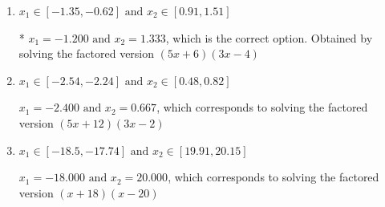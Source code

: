 \documentclass{extbook}[14pt]
\begin{document}
\begin{enumerate}
{\begin{enumerate}[label=\Alph*.]
$x_1 = -0.600 \text{ and } x_2 = 2.667$, which corresponds to solving the factored version $(5x + 3)(3x -8)$
\item \( x_1 \in [-1.35, -0.62] \text{ and } x_2 \in [0.91, 1.51] \)

* $x_1 = -1.200 \text{ and } x_2 = 1.333$, which is the correct option. Obtained by solving the factored version $(5x + 6)(3x -4)$
\item \( x_1 \in [-2.54, -2.24] \text{ and } x_2 \in [0.48, 0.82] \)

$x_1 = -2.400 \text{ and } x_2 = 0.667$, which corresponds to solving the factored version $(5x + 12)(3x -2)$
\item \( x_1 \in [-18.5, -17.74] \text{ and } x_2 \in [19.91, 20.15] \)

$x_1 = -18.000 \text{ and } x_2 = 20.000$, which corresponds to solving the factored version $(x + 18)(x -20)$
\end{enumerate}

}
\end{enumerate}
\end{document}
